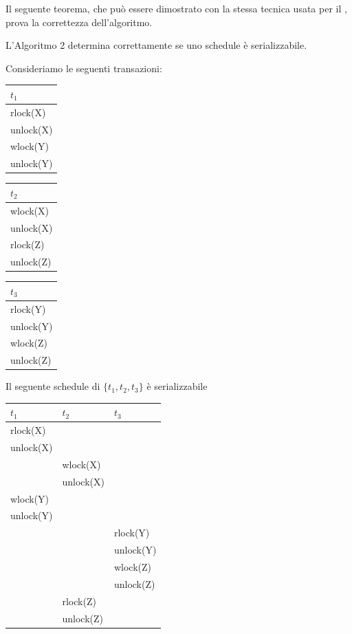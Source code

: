 Il seguente teorema, che può essere dimostrato con la stessa tecnica usata per il ,
prova la correttezza dell'algoritmo.
\begin{theo}
L'Algoritmo 2 determina correttamente se uno schedule è serializzabile. 
\end{theo}

Consideriamo le seguenti transazioni:
\begin{multicols}{3}
 \begin{tabular}{|l|}
  \hline
  $t_1$\\
  \hline
  rlock(X)\\
  unlock(X)\\
  wlock(Y)\\
  unlock(Y)\\
  \hline
 \end{tabular}
 
  \begin{tabular}{|l|}
  \hline
  $t_2$\\
  \hline
  wlock(X)\\
  unlock(X)\\
  rlock(Z)\\
  unlock(Z)\\
  \hline
 \end{tabular}
 
  \begin{tabular}{|l|}
  \hline
  $t_3$\\
  \hline
  rlock(Y)\\
  unlock(Y)\\
  wlock(Z)\\
  unlock(Z)\\
  \hline
 \end{tabular}
\end{multicols}

Il seguente schedule di $\{t_1, t_2, t_3\}$ è serializzabile
\begin{center}
\begin{tabular}{|l|l|l|}
 \hline
 $t_1$ & $t_2$ & $t_3$\\
 \hline
 rlock(X)& &\\
 unlock(X)& &\\
 & wlock(X)& \\
 & unlock(X)& \\
 wlock(Y)& & \\
 unlock(Y)& &\\
 & & rlock(Y)\\
 & & unlock(Y)\\
 & &wlock(Z)\\
 & &unlock(Z)\\
 & rlock(Z)& \\
 & unlock(Z)& \\
\hline
 \end{tabular}
\end{center}


